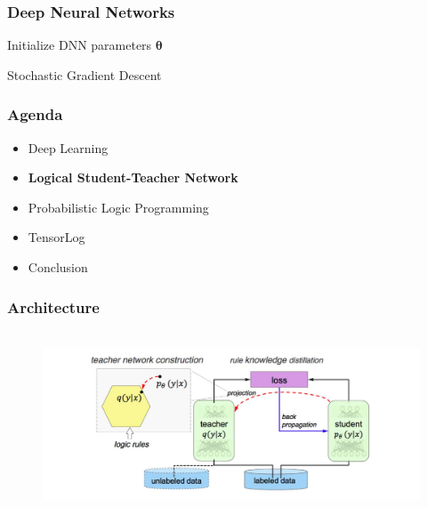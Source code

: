 \documentclass{beamer}
\begin{document}
\begin{frame}
\frametitle{Deep Neural Networks}
	\begin{algorithm}[H]
	Initialize DNN parameters $\boldsymbol{\theta}$ \\
	\caption{Stochastic Gradient Descent}
\end{algorithm}
\end{frame}

\begin{frame}
\frametitle{Agenda}
\begin{itemize}
	\item Deep Learning
	\item \textbf{Logical Student-Teacher Network}
	\item Probabilistic Logic Programming
	\item TensorLog
	\item Conclusion
\end{itemize}
\end{frame}

\begin{frame}
	\frametitle{Architecture}
	\begin{figure}
		\begin{center}
			\includegraphics[width=12cm, height=5.5cm]{teacher_dnn}
		\end{center}
	\end{figure}
\end{frame}
\end{document}
